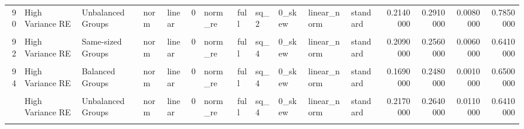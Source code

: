 \documentclass[12pt]{article}
\begin{document}
\begin{table}
{\begin{tabular}[t]{rllllrllllllrrrr}
90 & High Variance RE & Unbalanced Groups & norm & linear & 0 & norm\_re & full & sq\_2 & 0\_skew & linear\_norm & standard & 0.2140000 & 0.2910000 & 0.0080000 & 0.7850000\\
\addlinespace
\cellcolor{gray!6}{91} & \cellcolor{gray!6}{High Variance Error} & \cellcolor{gray!6}{Same-sized Groups} & \cellcolor{gray!6}{norm} & \cellcolor{gray!6}{linear} & \cellcolor{gray!6}{0} & \cellcolor{gray!6}{norm\_re} & \cellcolor{gray!6}{full} & \cellcolor{gray!6}{sq\_4} & \cellcolor{gray!6}{0\_skew} & \cellcolor{gray!6}{linear\_norm} & \cellcolor{gray!6}{standard} & \cellcolor{gray!6}{0.0540000} & \cellcolor{gray!6}{0.2920000} & \cellcolor{gray!6}{0.2950000} & \cellcolor{gray!6}{0.4020000}\\
92 & High Variance RE & Same-sized Groups & norm & linear & 0 & norm\_re & full & sq\_4 & 0\_skew & linear\_norm & standard & 0.2090000 & 0.2560000 & 0.0060000 & 0.6410000\\
\cellcolor{gray!6}{93} & \cellcolor{gray!6}{High Variance Error} & \cellcolor{gray!6}{Balanced Groups} & \cellcolor{gray!6}{norm} & \cellcolor{gray!6}{linear} & \cellcolor{gray!6}{0} & \cellcolor{gray!6}{norm\_re} & \cellcolor{gray!6}{full} & \cellcolor{gray!6}{sq\_4} & \cellcolor{gray!6}{0\_skew} & \cellcolor{gray!6}{linear\_norm} & \cellcolor{gray!6}{standard} & \cellcolor{gray!6}{0.0590000} & \cellcolor{gray!6}{0.2610000} & \cellcolor{gray!6}{0.2860000} & \cellcolor{gray!6}{0.3930000}\\
94 & High Variance RE & Balanced Groups & norm & linear & 0 & norm\_re & full & sq\_4 & 0\_skew & linear\_norm & standard & 0.1690000 & 0.2480000 & 0.0010000 & 0.6500000\\
\cellcolor{gray!6}{95} & \cellcolor{gray!6}{High Variance Error} & \cellcolor{gray!6}{Unbalanced Groups} & \cellcolor{gray!6}{norm} & \cellcolor{gray!6}{linear} & \cellcolor{gray!6}{0} & \cellcolor{gray!6}{norm\_re} & \cellcolor{gray!6}{full} & \cellcolor{gray!6}{sq\_4} & \cellcolor{gray!6}{0\_skew} & \cellcolor{gray!6}{linear\_norm} & \cellcolor{gray!6}{standard} & \cellcolor{gray!6}{0.0530000} & \cellcolor{gray!6}{0.3120000} & \cellcolor{gray!6}{0.2470000} & \cellcolor{gray!6}{0.4090000}\\
\addlinespace
96 & High Variance RE & Unbalanced Groups & norm & linear & 0 & norm\_re & full & sq\_4 & 0\_skew & linear\_norm & standard & 0.2170000 & 0.2640000 & 0.0110000 & 0.6410000\\
\cellcolor{gray!6}{97} & \cellcolor{gray!6}{High Variance Error} & \cellcolor{gray!6}{Same-sized Groups} & \cellcolor{gray!6}{norm} & \cellcolor{gray!6}{linear} & \cellcolor{gray!6}{0} & \cellcolor{gray!6}{norm\_re} & \cellcolor{gray!6}{full} & \cellcolor{gray!6}{sq\_8} & \cellcolor{gray!6}{0\_skew} & \cellcolor{gray!6}{linear\_norm} & \cellcolor{gray!6}{standard} & \cellcolor{gray!6}{0.0580000} & \cellcolor{gray!6}{0.4420000} & \cellcolor{gray!6}{0.5040000} & \cellcolor{gray!6}{0.3110000}\\

\end{tabular}}
\end{table}
\end{document}
